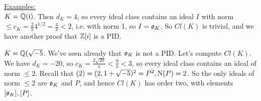 \documentclass[10pt,a4paper]{article}
\begin{document}
\hspace*{-1em}\underline{Examples:}\\
$K = \mathbb{Q}(\mathfrak{i})$. Then $d_K = 4$, so every ideal class contains an ideal $I$ with norm $\leq c_K = \frac{2}{\pi}4^{1/2} = \frac{4}{\pi} < 2$, i.e. with norm 1, so $I = \mathfrak{o}_K$. So $Cl(K)$ is trivial, and we have another proof that $\mathbb{Z}[i]$ is a PID.

$K = \mathbb{Q}(\sqrt{-5}$. We've seen already that $\mathfrak{o}_K$ is not a PID. Let's compute $Cl(K)$. We have $d_K = -20$, so $c_K = \frac{2\sqrt{20}}{\pi} < \frac{9}{\pi} < 3$, so every ideal class contains an ideal of norm $\leq 2$. Recall that $(2) = (2, 1+\sqrt{-5})^2 = P^2, \operatorname{N}(P) = 2$. So the only ideals of norm $\leq 2$ are $\mathfrak{o}_K$ and $P$, and hence $Cl(K)$ has order two, with elements $[\mathfrak{o}_K], [P]$. 
\end{document}
